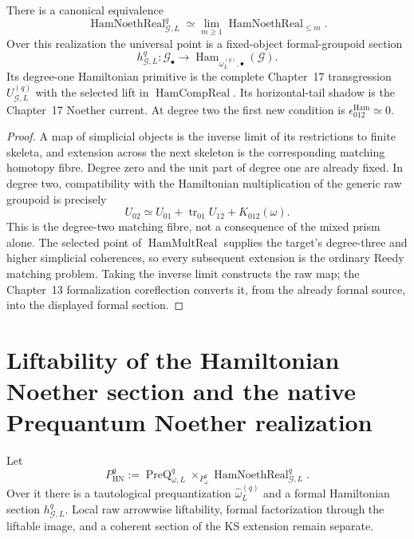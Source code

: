 \begin{theorem}
\label{thm:prequantum-field-hamiltonian-groupoid-realization}
There is a canonical equivalence
\[
\boxed{
\operatorname{HamNoethReal}_{\mathcal G,L}^{q}
\simeq
\lim_{m\ge1}\operatorname{HamNoethReal}_{\le m}.
}
\]
Over this realization the universal point is a fixed-object formal-groupoid
section
\[
\boxed{
h_{\mathcal G,L}^{q}:
\mathcal G_\bullet
\longrightarrow
\operatorname{Ham}_{\omega_L^{(q)},\bullet}(\mathcal G).
}
\]
Its degree-one Hamiltonian primitive is the complete Chapter~17 transgression
$U_{\mathcal G,L}^{(q)}$ with the selected lift in
$\operatorname{HamCompReal}$.  Its horizontal-tail shadow is the Chapter~17
Noether current.  At degree two the first new condition is
$\epsilon^{\mathrm{Ham}}_{012}\simeq0$.
\end{theorem}

\begin{proof}
A map of simplicial objects is the inverse limit of its restrictions to finite
skeleta, and extension across the next skeleton is the corresponding matching
homotopy fibre.  Degree zero and the unit part of degree one are already fixed.
In degree two, compatibility with the Hamiltonian multiplication of the generic
raw groupoid is precisely
\[
U_{02}\simeq U_{01}+\operatorname{tr}_{01}U_{12}+K_{012}(\omega).
\]
This is the degree-two matching fibre, not a consequence of the mixed prism
alone.  The selected point of $\operatorname{HamMultReal}$ supplies the target's
degree-three and higher simplicial coherences, so every subsequent extension is
the ordinary Reedy matching problem.  Taking the inverse limit constructs the
raw map; the Chapter~13 formalization coreflection converts it, from the already
formal source, into the displayed formal section.
\end{proof}

\section{Liftability of the Hamiltonian Noether section and the native Prequantum Noether realization}
\label{sec:prequantum-noether-realization}

Let
\[
P_{\mathrm{HN}}^q
:=
\operatorname{PreQ}_{\omega,L}^{q}
\times_{P_\omega^q}
\operatorname{HamNoethReal}_{\mathcal G,L}^{q}.
\]
Over it there is a tautological prequantization $\widehat\omega_L^{(q)}$ and a
formal Hamiltonian section $h_{\mathcal G,L}^q$.  Local raw arrowwise liftability,
formal factorization through the liftable image, and a coherent section of the KS
extension remain separate.

